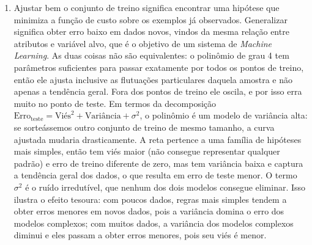 \documentclass{dlproblemset}
\begin{document}
\begin{enumerate}[1)]
    \item Ajustar bem o conjunto de treino significa encontrar uma hipótese que minimiza a função de custo sobre os exemplos já observados. Generalizar significa obter erro baixo em dados novos, vindos da mesma relação entre atributos e variável alvo, que é o objetivo de um sistema de \textit{Machine Learning}. As duas coisas não são equivalentes: o polinômio de grau 4 tem parâmetros suficientes para passar exatamente por todos os pontos de treino, então ele ajusta inclusive as flutuações particulares daquela amostra e não apenas a tendência geral. Fora dos pontos de treino ele oscila, e por isso erra muito no ponto de teste. Em termos da decomposição $\text{Erro}_{\text{teste}} = \text{Viés}^2 + \text{Variância} + \sigma^2$, o polinômio é um modelo de variância alta: se sorteássemos outro conjunto de treino de mesmo tamanho, a curva ajustada mudaria drasticamente. A reta pertence a uma família de hipóteses mais simples, então tem viés maior (não consegue representar qualquer padrão) e erro de treino diferente de zero, mas tem variância baixa e captura a tendência geral dos dados, o que resulta em erro de teste menor. O termo $\sigma^2$ é o ruído irredutível, que nenhum dos dois modelos consegue eliminar. Isso ilustra o efeito tesoura: com poucos dados, regras mais simples tendem a obter erros menores em novos dados, pois a variância domina o erro dos modelos complexos; com muitos dados, a variância dos modelos complexos diminui e eles passam a obter erros menores, pois seu viés é menor.
\end{enumerate}
\end{document}
